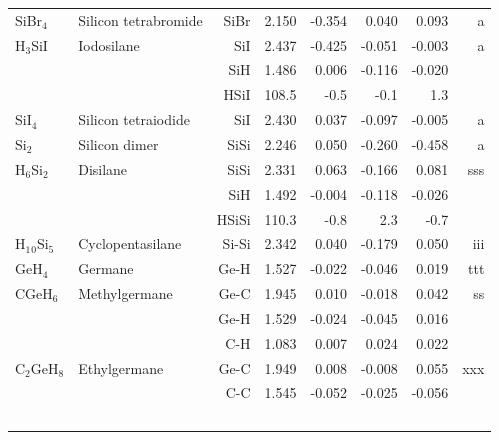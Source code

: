 \begin{table}
\begin{center}
\begin{tabular}{llrrrrrr}
 SiBr$_4$       & Silicon tetrabromide               &SiBr           &     2.150   &    -0.354 &     0.040 &     0.093 &     a \\
 H$_3$SiI       & Iodosilane                         &SiI            &     2.437   &    -0.425 &    -0.051 &    -0.003 &     a \\
             &                                    &SiH            &     1.486   &     0.006 &    -0.116 &    -0.020 &       \\
             &                                    &HSiI         &     108.5   &      -0.5 &      -0.1 &       1.3   &       \\
 SiI$_4$        & Silicon tetraiodide                &SiI            &     2.430   &     0.037 &    -0.097 &    -0.005 &     a \\
 Si$_2$         & Silicon dimer                      &SiSi           &     2.246   &     0.050 &    -0.260 &    -0.458 &     a \\
 H$_6$Si$_2$       & Disilane                           &SiSi           &     2.331   &     0.063 &    -0.166 &     0.081 &   sss \\
             &                                    &SiH            &     1.492   &    -0.004 &    -0.118 &    -0.026 &       \\
             &                                    &HSiSi        &     110.3   &      -0.8 &       2.3 &      -0.7   &       \\
 H$_1$$_0$Si$_5$      & Cyclopentasilane                   &Si-Si          &     2.342   &     0.040 &    -0.179 &     0.050 &   iii \\
 GeH$_4$        & Germane                            &Ge-H           &     1.527   &    -0.022 &    -0.046 &     0.019 &   ttt \\
 CGeH$_6$       & Methylgermane                      &Ge-C           &     1.945   &     0.010 &    -0.018 &     0.042 &    ss \\
             &                                    &Ge-H           &     1.529   &    -0.024 &    -0.045 &     0.016 &       \\
             &                                    &C-H            &     1.083   &     0.007 &     0.024 &     0.022 &       \\
 C$_2$GeH$_8$      & Ethylgermane                       &Ge-C           &     1.949   &     0.008 &    -0.008 &     0.055 &   xxx \\
             &                                    &C-C            &     1.545   &    -0.052 &    -0.025 &    -0.056 &       \\
$$
\end{tabular}
\end{center}
\end{table}

